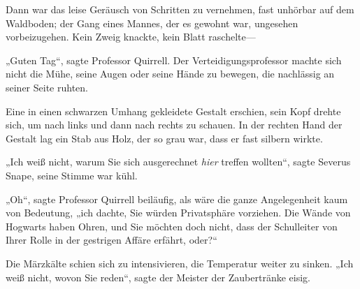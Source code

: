 Dann war das leise Geräusch von Schritten zu vernehmen, fast unhörbar auf dem Waldboden; der Gang eines Mannes, der es gewohnt war, ungesehen vorbeizugehen. Kein Zweig knackte, kein Blatt raschelte—

„Guten Tag“, sagte Professor Quirrell. Der Verteidigungsprofessor machte sich nicht die Mühe, seine Augen oder seine Hände zu bewegen, die nachlässig an seiner Seite ruhten.

Eine in einen schwarzen Umhang gekleidete Gestalt erschien, sein Kopf drehte sich, um nach links und dann nach rechts zu schauen. In der rechten Hand der Gestalt lag ein Stab aus Holz, der so grau war, dass er fast silbern wirkte.

„Ich weiß nicht, warum Sie sich ausgerechnet \emph{hier} treffen wollten“, sagte Severus Snape, seine Stimme war kühl.

„Oh“, sagte Professor Quirrell beiläufig, als wäre die ganze Angelegenheit kaum von Bedeutung, „ich dachte, Sie würden Privatsphäre vorziehen. Die Wände von Hogwarts haben Ohren, und Sie möchten doch nicht, dass der Schulleiter von Ihrer Rolle in der gestrigen Affäre erfährt, oder?“

Die Märzkälte schien sich zu intensivieren, die Temperatur weiter zu sinken. „Ich weiß nicht, wovon Sie reden“, sagte der Meister der Zaubertränke eisig.

